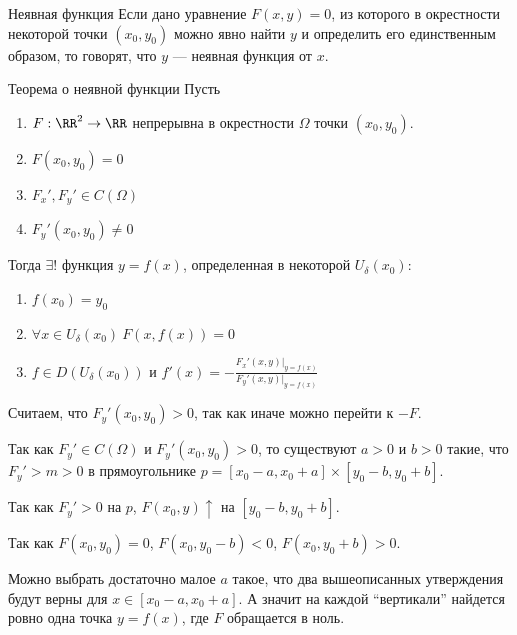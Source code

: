\begin{defn}{Неявная функция}{}
    Если дано уравнение \( F(x, y) = 0 \), из которого в окрестности некоторой точки \( (x_0, y_0) \)
    можно явно найти \( y \) и определить его единственным образом,
    то говорят, что \( y \) --- неявная функция от \( x \).
\end{defn}

\begin{thrm}{Теорема о неявной функции}{}
    Пусть
    \begin{enumerate}
        \item
            \( F : \RR^2 \to \RR \) непрерывна в окрестности \( \Omega \) точки \( (x_0, y_0) \).
        \item
            \( F(x_0, y_0) = 0 \)
        \item
            \( F_x', F_y' \in C(\Omega) \)
        \item
            \( F_y' (x_0, y_0) \neq 0 \)
    \end{enumerate}

    Тогда \( \exists! \) функция \( y = f(x) \),
    определенная в некоторой \( U_{\delta} (x_0) \):
    \begin{enumerate}
        \item
            \( f(x_0) = y_0 \)
        \item
            \( \forall x \in U_{\delta} (x_0) \: F(x, f(x)) = 0 \)
        \item
            \( f \in D(U_{\delta} (x_0)) \) и \( f'(x) = - \frac{F_x'(x, y) |_{y = f(x)} }{F_y'(x, y) |_{y = f(x)} } \)
    \end{enumerate}
\end{thrm}

Считаем, что \( F_y' (x_0, y_0) > 0 \), так как иначе можно перейти к \( -F \).

Так как \( F_y' \in C(\Omega) \) и \( F_y'(x_0, y_0) > 0 \),
то существуют \( a > 0 \) и \( b > 0 \) такие, что \( F_y' > m > 0 \)
в прямоугольнике \( p = [x_0 - a, x_0 + a] \times [y_0 - b, y_0 + b] \).

Так как \( F_y' > 0 \) на \( p \), \( F(x_0, y) \uparrow \) на \( [y_0 - b, y_0 + b] \).

Так как \( F(x_0, y_0) = 0 \), \( F(x_0, y_0 - b) < 0 \), \( F(x_0, y_0 + b) > 0 \).

Можно выбрать достаточно малое \( a \) такое, что два вышеописанных утверждения
будут верны для \( x \in [x_0 - a, x_0 + a] \).
А значит на каждой ``вертикали'' найдется ровно одна точка \( y = f(x) \), где \( F \) обращается в ноль.

